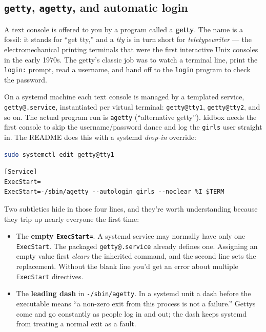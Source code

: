 \documentclass[11pt,oneside]{article}
\newcommand{\code}[1]{\texorpdfstring{\textcolor{kbblue}{\texttt{#1}}}{#1}}
\begin{document}
\subsection{\texttt{getty}, \texttt{agetty}, and automatic login}

A text console is offered to you by a program called a \textbf{getty}. The name
is a fossil: it stands for ``get tty,'' and a \emph{tty} is in turn short for
\emph{teletypewriter} --- the electromechanical printing terminals that were the
first interactive Unix consoles in the early 1970s. The getty's classic job was
to watch a terminal line, print the \texttt{login:} prompt, read a username, and
hand off to the \texttt{login} program to check the password.

On a systemd machine each text console is managed by a templated service,
\texttt{getty@.service}, instantiated per virtual terminal: \texttt{getty@tty1},
\texttt{getty@tty2}, and so on. The actual program run is \texttt{agetty}
(``alternative getty''). kidbox needs the first console to skip the
username/password dance and log the \texttt{girls} user straight in. The README
does this with a systemd \emph{drop-in} override:

\begin{lstlisting}[language=bash]
sudo systemctl edit getty@tty1
\end{lstlisting}

\begin{lstlisting}
[Service]
ExecStart=
ExecStart=-/sbin/agetty --autologin girls --noclear %I $TERM
\end{lstlisting}

Two subtleties hide in those four lines, and they're worth understanding
because they trip up nearly everyone the first time:

\begin{itemize}
\item The \textbf{empty \code{ExecStart=}}. A systemd service may normally have
only one \texttt{ExecStart}. The packaged \texttt{getty@.service} already
defines one. Assigning an empty value first \emph{clears} the inherited command,
and the second line sets the replacement. Without the blank line you'd get an
error about multiple \texttt{ExecStart} directives.
\item The \textbf{leading dash} in \code{-/sbin/agetty}. In a systemd unit a
dash before the executable means ``a non-zero exit from this process is not a
failure.'' Gettys come and go constantly as people log in and out; the dash
keeps systemd from treating a normal exit as a fault.
\end{itemize}
\end{document}
